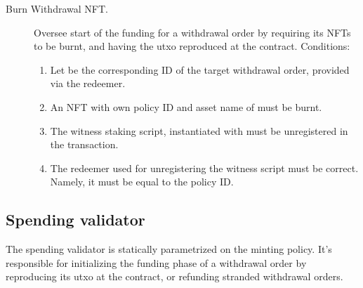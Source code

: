 \documentclass[../midgard.tex]{subfiles}
\begin{document}
\begin{description}
    \item[Burn Withdrawal NFT.] Oversee start of the funding for a withdrawal order by requiring its NFTs to be burnt, and having the utxo reproduced at the  contract.
    Conditions:
      \begin{enumerate}
        \item Let  be the corresponding ID of the target withdrawal order, provided via the redeemer.
        \item An NFT with own policy ID and asset name of  must be burnt.
        \item The witness staking script, instantiated with  must be unregistered in the transaction.
        \item The redeemer used for unregistering the witness script must be correct.
          Namely, it must be equal to the  policy ID.
      \end{enumerate}
\end{description}

\subsection{Spending validator}
\label{h:withdrawal-order-spending-validator}

The  spending validator is statically parametrized on the  minting policy.
It's responsible for initializing the funding phase of a withdrawal order by reproducing its utxo at the  contract, or refunding stranded withdrawal orders.
\end{document}
